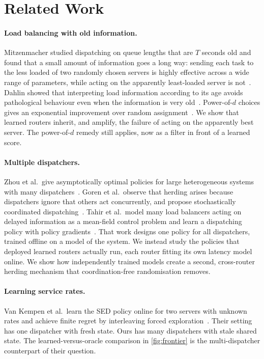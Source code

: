 \documentclass[10pt,twocolumn,letterpaper]{article}
\begin{document}
\section{Related Work}

\paragraph{Load balancing with old information.} Mitzenmacher studied
dispatching on queue lengths that are $T$ seconds old and found that a small
amount of information goes a long way: sending each task to the less loaded
of two randomly chosen servers is highly effective across a wide range of
parameters, while acting on the apparently least-loaded server is
not~\citep{mitzenmacher2000old}. Dahlin showed that interpreting load
information according to its age avoids pathological behaviour even when the
information is very old~\citep{dahlin2000stale}. Power-of-$d$ choices gives
an exponential improvement over random assignment~\citep{mitzenmacher2001power}.
We show that learned routers inherit, and amplify, the failure of acting on
the apparently best server. The power-of-$d$ remedy still applies, now as a
filter in front of a learned score.

\paragraph{Multiple dispatchers.} Zhou et al.\ give asymptotically optimal
policies for large heterogeneous systems with many
dispatchers~\citep{zhou2021multidispatcher}. Goren et al.\ observe that
herding arises because dispatchers ignore that others act concurrently, and
propose stochastically coordinated dispatching~\citep{goren2021stochastic}.
Tahir et al.\ model many load balancers acting on delayed information as a
mean-field control problem and learn a dispatching policy with policy
gradients~\citep{tahir2022meanfield}. That work designs one policy for all
dispatchers, trained offline on a model of the system. We instead study the
policies that deployed learned routers actually run, each router fitting its
own latency model online. We show how independently trained models create a
second, cross-router herding mechanism that coordination-free randomisation
removes.

\paragraph{Learning service rates.} Van Kempen et al.\ learn the SED policy
online for two servers with unknown rates and achieve finite regret by
interleaving forced exploration~\citep{vankempen2026adaptivesed}. Their
setting has one dispatcher with fresh state. Ours has many dispatchers with
stale shared state. The learned-versus-oracle comparison in
\cref{fig:frontier} is the multi-dispatcher counterpart of their question.
\end{document}
